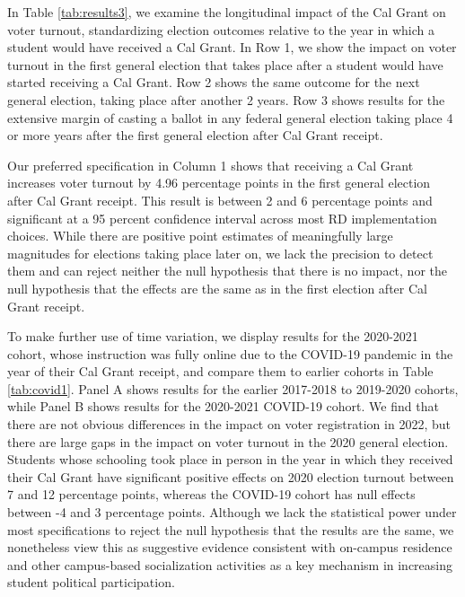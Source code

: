 \documentclass[12pt,letterpaper,oneside]{book}
\begin{document}
In Table \ref{tab:results3}, we examine the longitudinal impact of the Cal Grant on voter turnout, standardizing election outcomes relative to the year in which a student would have received a Cal Grant. In Row 1, we show the impact on voter turnout in the first general election that takes place after a student would have started receiving a Cal Grant. Row 2 shows the same outcome for the next general election, taking place after another 2 years. Row 3 shows results for the extensive margin of casting a ballot in any federal general election taking place 4 or more years after the first general election after Cal Grant receipt.

Our preferred specification in Column 1 shows that receiving a Cal Grant increases voter turnout by 4.96 percentage points in the first general election after Cal Grant receipt. This result is between 2 and 6 percentage points and significant at a 95 percent confidence interval across most RD implementation choices. While there are positive point estimates of meaningfully large magnitudes for elections taking place later on, we lack the precision to detect them and can reject neither the null hypothesis that there is no impact, nor the null hypothesis that the effects are the same as in the first election after Cal Grant receipt.

To make further use of time variation, we display results for the 2020-2021 cohort, whose instruction was fully online due to the COVID-19 pandemic in the year of their Cal Grant receipt, and compare them to earlier cohorts in Table \ref{tab:covid1}. Panel A shows results for the earlier 2017-2018 to 2019-2020 cohorts, while Panel B shows results for the 2020-2021 COVID-19 cohort. We find that there are not obvious differences in the impact on voter registration in 2022, but there are large gaps in the impact on voter turnout in the 2020 general election. Students whose schooling took place in person in the year in which they received their Cal Grant have significant positive effects on 2020 election turnout between 7 and 12 percentage points, whereas the COVID-19 cohort has null effects between -4 and 3 percentage points. Although we lack the statistical power under most specifications to reject the null hypothesis that the results are the same, we nonetheless view this as suggestive evidence consistent with on-campus residence and other campus-based socialization activities as a key mechanism in increasing student political participation.
\end{document}
